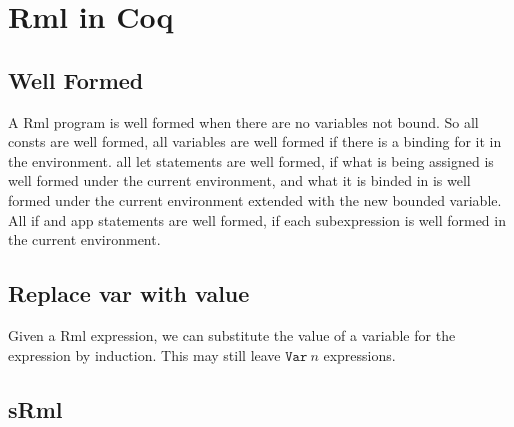 \documentclass[11pt, leqno]{article}
\begin{document}
\section{Rml in Coq}

\subsection{Well Formed}
A Rml program is well formed when there are no variables not bound. So all consts are well formed, all variables are well formed if there is a binding for it in the environment. all let statements are well formed, if what is being assigned is well formed under the current environment, and what it is binded in is well formed under the current environment extended with the new bounded variable. All if and app statements are well formed, if each subexpression is well formed in the current environment.

\subsection{Replace var with value}
Given a Rml expression, we can substitute the value of a variable for the expression by induction. This may still leave \(\mathtt{Var}~n\) expressions.

\subsection{sRml}
\end{document}
